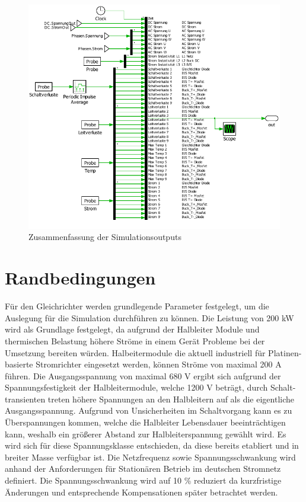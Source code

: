 \begin{figure}
\centering
\includegraphics[width=1\linewidth]{content/Grafiken/Plecs_Out}
\caption{Zusammenfassung der Simulationsoutputs}
\label{fig:plecsout}
\end{figure}


\section{Randbedingungen}
Für den Gleichrichter werden grundlegende Parameter festgelegt, um die Auslegung für die Simulation durchführen zu können. Die Leistung von 200 kW wird als Grundlage festgelegt, da aufgrund der Halbleiter Module und thermischen Belastung höhere Ströme in einem Gerät Probleme bei der Umsetzung bereiten würden. Halbeitermodule die aktuell industriell für Platinen-basierte Stromrichter eingesetzt werden, können Ströme von maximal 200 A führen. Die Ausgangsspannung von maximal 680 V ergibt sich aufgrund der Spannungsfestigkeit der Halbleitermodule, welche 1200 V beträgt, durch Schalt-transienten treten höhere Spannungen an den Halbleitern auf als die eigentliche Ausgangsspannung. Aufgrund von Unsicherheiten im Schaltvorgang kann es zu Überspannungen kommen, welche die Halbleiter Lebensdauer beeinträchtigen kann, weshalb ein größerer Abstand zur Halbleiterspannung gewählt wird. Es wird sich für diese Spannungsklasse entschieden, da diese bereits etabliert und in breiter Masse verfügbar ist. Die Netzfrequenz sowie Spannungsschwankung wird anhand der Anforderungen für Stationären Betrieb im deutschen Stromnetz definiert. Die Spannungsschwankung wird auf 10 \% reduziert da kurzfristige Änderungen und entsprechende Kompensationen später betrachtet werden.  \\

